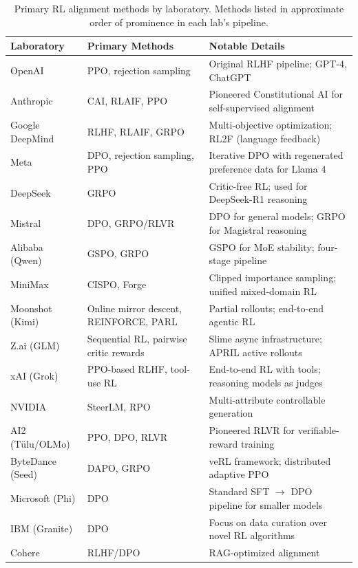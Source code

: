 \documentclass[12pt]{article}
\begin{document}
\begin{table}[h]
\centering
\small
\caption{Primary RL alignment methods by laboratory. Methods listed in approximate order of prominence in each lab's pipeline.}
\label{tab:labs}
\begin{tabular}{@{}p{3cm}p{4cm}p{6cm}@{}}
\toprule
\textbf{Laboratory} & \textbf{Primary Methods} & \textbf{Notable Details} \\
\midrule
OpenAI & PPO, rejection sampling & Original RLHF pipeline; GPT-4, ChatGPT \\
\addlinespace
Anthropic & CAI, RLAIF, PPO & Pioneered Constitutional AI for self-supervised alignment \\
\addlinespace
Google DeepMind & RLHF, RLAIF, GRPO & Multi-objective optimization; RL2F (language feedback) \\
\addlinespace
Meta & DPO, rejection sampling, PPO & Iterative DPO with regenerated preference data for Llama 4 \\
\addlinespace
DeepSeek & GRPO & Critic-free RL; used for DeepSeek-R1 reasoning \\
\addlinespace
Mistral & DPO, GRPO/RLVR & DPO for general models; GRPO for Magistral reasoning \\
\addlinespace
Alibaba (Qwen) & GSPO, GRPO & GSPO for MoE stability; four-stage pipeline \\
\addlinespace
MiniMax & CISPO, Forge & Clipped importance sampling; unified mixed-domain RL \\
\addlinespace
Moonshot (Kimi) & Online mirror descent, REINFORCE, PARL & Partial rollouts; end-to-end agentic RL \\
\addlinespace
Z.ai (GLM) & Sequential RL, pairwise critic rewards & Slime async infrastructure; APRIL active rollouts \\
\addlinespace
xAI (Grok) & PPO-based RLHF, tool-use RL & End-to-end RL with tools; reasoning models as judges \\
\addlinespace
NVIDIA & SteerLM, RPO & Multi-attribute controllable generation \\
\addlinespace
AI2 (T\"ulu/OLMo) & PPO, DPO, RLVR & Pioneered RLVR for verifiable-reward training \\
\addlinespace
ByteDance (Seed) & DAPO, GRPO & veRL framework; distributed adaptive PPO \\
\addlinespace
Microsoft (Phi) & DPO & Standard SFT $\rightarrow$ DPO pipeline for smaller models \\
\addlinespace
IBM (Granite) & DPO & Focus on data curation over novel RL algorithms \\
\addlinespace
Cohere & RLHF/DPO & RAG-optimized alignment \\
\bottomrule
\end{tabular}
\end{table}
\end{document}
